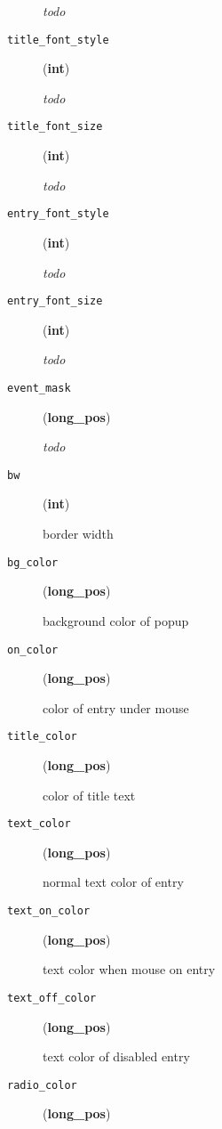 \begin{description}
\emph{todo}

\item[{\texttt{title\_font\_style}}] \leavevmode (\textbf{int})

\emph{todo}

\item[{\texttt{title\_font\_size}}] \leavevmode (\textbf{int})

\emph{todo}

\item[{\texttt{entry\_font\_style}}] \leavevmode (\textbf{int})

\emph{todo}

\item[{\texttt{entry\_font\_size}}] \leavevmode (\textbf{int})

\emph{todo}

\item[{\texttt{event\_mask}}] \leavevmode (\textbf{long\_pos})

\emph{todo}

\item[{\texttt{bw}}] \leavevmode (\textbf{int})

border width

\item[{\texttt{bg\_color}}] \leavevmode (\textbf{long\_pos})

background color of popup

\item[{\texttt{on\_color}}] \leavevmode (\textbf{long\_pos})

color of entry under mouse

\item[{\texttt{title\_color}}] \leavevmode (\textbf{long\_pos})

color of title text

\item[{\texttt{text\_color}}] \leavevmode (\textbf{long\_pos})

normal text color of entry

\item[{\texttt{text\_on\_color}}] \leavevmode (\textbf{long\_pos})

text color when mouse on entry

\item[{\texttt{text\_off\_color}}] \leavevmode (\textbf{long\_pos})

text color of disabled entry

\item[{\texttt{radio\_color}}] \leavevmode (\textbf{long\_pos})


\end{description}
